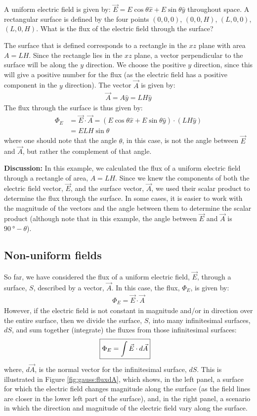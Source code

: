 \begin{example}{A uniform electric field is given by: $\vec E=E\cos\theta\hat x+E\sin\theta\hat y $ throughout space. A rectangular surface is defined by the four points $(0,0,0)$, $(0,0,H)$, $(L,0,0)$, $(L,0,H)$. What is the flux of the electric field through the surface?}

The surface that is defined corresponds to a rectangle in the $xz$ plane with area $A=LH$. Since the rectangle lies in the $xz$ plane, a vector perpendicular to the surface will be along the $y$ direction. We choose the positive $y$ direction, since this will give a positive number for the flux (as the electric field has a positive component in the $y$ direction). The vector $\vec A$ is given by:
\begin{align*}
\vec A =A\hat y=LH\hat y
\end{align*}
The flux through the surface is thus given by:
\begin{align*}
\Phi_E&=\vec E\cdot \vec A=(E\cos\theta\hat x+E\sin\theta\hat y)\cdot(LH\hat y)\\
&=ELH\sin\theta
\end{align*}
where one should note that the angle $\theta$, in this case, is not the angle between $\vec E$ and $\vec A$, but rather the complement of that angle. 

\textbf{Discussion:} In this example, we calculated the flux of a uniform electric field through a rectangle of area, $A=LH$. Since we knew the components of both the electric field vector, $\vec E$, and the surface vector, $\vec A$, we used their scalar product to determine the flux through the surface. In some cases, it is easier to work with the magnitude of the vectors and the angle between them to determine the scalar product (although note that in this example, the angle between $\vec E$ and $\vec A$ is $\SI{90}{\degree}-\theta$).
\end{example}

\subsection{Non-uniform fields}
So far, we have considered the flux of a uniform electric field, $\vec E$, through a surface, $S$, described by a vector, $\vec A$. In this case, the flux, $\Phi_E$, is given by:
\begin{align*}
\Phi_E=\vec E\cdot \vec A
\end{align*}
However, if the electric field is not constant in magnitude and/or in direction over the entire surface, then we divide the surface, $S$, into many infinitesimal surfaces, $dS$, and sum together (integrate) the fluxes from those infinitesimal surfaces:
\begin{align*}
\Aboxed{\Phi_E=\int \vec E\cdot d\vec A}
\end{align*}
where, $d\vec A$, is the normal vector for the infinitesimal surface, $dS$. This is illustrated in Figure \ref{fig:gauss:fluxdA}, which shows, in the left panel, a surface for which the electric field changes magnitude along the surface (as the field lines are closer in the lower left part of the surface), and, in the right panel, a scenario in which the direction and magnitude of the electric field vary along the surface.

